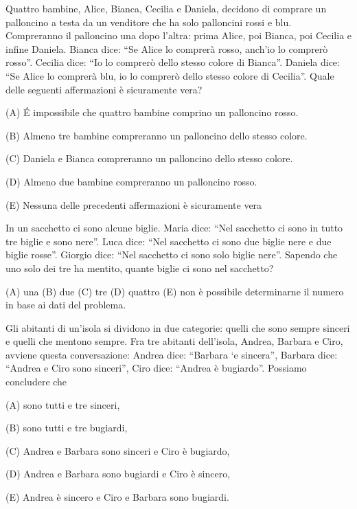 \begin{esercizio}
    \label{ex:archimede_2005_triennio_21}
    Quattro bambine, Alice, Bianca, Cecilia e Daniela, decidono di comprare un palloncino a testa da un venditore che
    ha solo palloncini rossi e blu.
    Compreranno il palloncino una dopo l’altra: prima Alice, poi Bianca, poi Cecilia e infine Daniela.
    Bianca dice: “Se Alice lo comprerà rosso, anch’io lo comprerò rosso”.
    Cecilia dice: “Io lo comprerò dello stesso colore di Bianca”.
    Daniela dice: “Se Alice lo comprerà blu, io lo comprerò dello stesso colore di Cecilia”.
    Quale delle seguenti affermazioni è sicuramente vera?

    (A) \'{E} impossibile che quattro bambine comprino un palloncino rosso.

    (B) Almeno tre bambine compreranno un palloncino dello stesso colore.

    (C) Daniela e Bianca compreranno un palloncino dello stesso colore.

    (D) Almeno due bambine compreranno un palloncino rosso.

    (E) Nessuna delle precedenti affermazioni è sicuramente vera
\end{esercizio}

\begin{esercizio}
    \label{ex:archimede_2006_biennio_10}
    In un sacchetto ci sono alcune biglie.
    Maria dice: “Nel sacchetto ci sono in tutto tre biglie e sono nere”.
    Luca dice: “Nel sacchetto ci sono due biglie nere e due biglie rosse”.
    Giorgio dice: “Nel sacchetto ci sono solo biglie nere”.
    Sapendo che uno solo dei tre ha mentito, quante biglie ci sono nel sacchetto?

    (A) una \quad (B) due \quad (C) tre \quad (D) quattro \quad
    (E) non è possibile determinarne il numero in base ai dati del problema.
\end{esercizio}

\begin{esercizio}
    \label{ex:archimede_2006_triennio_19}
    Gli abitanti di un’isola si dividono in due categorie: quelli che sono sempre sinceri e quelli che mentono sempre.
    Fra tre abitanti dell’isola, Andrea, Barbara e Ciro, avviene questa conversazione:
    Andrea dice: “Barbara `e sincera”, Barbara dice: “Andrea e Ciro sono sinceri”, Ciro dice: “Andrea è bugiardo”.
    Possiamo concludere che

    (A) sono tutti e tre sinceri,

    (B) sono tutti e tre bugiardi,

    (C) Andrea e Barbara sono sinceri e Ciro è bugiardo,

    (D) Andrea e Barbara sono bugiardi e Ciro è sincero,

    (E) Andrea è sincero e Ciro e Barbara sono bugiardi.
\end{esercizio}

